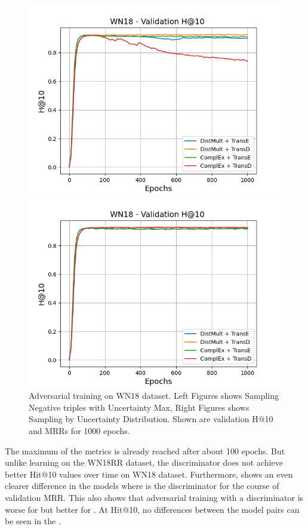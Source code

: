 \begin{figure}
\begin{minipage}{.5\textwidth}
    \end{minipage}
    \begin{minipage}{.5\textwidth}
      \centering
      \includegraphics[width=0.9\linewidth]{figures/results/gan_train/not_pretrained/uncertainty/max/entropy/wn18/1k_epochs/uncertainty_wn18_hit10.png}
    \end{minipage}%
    \begin{minipage}{.5\textwidth}
      \centering
      \includegraphics[width=0.9\linewidth]{figures/results/gan_train/not_pretrained/uncertainty/max_distribution/entropy/wn18/1k_epochs/uncertainty_wn18_hit10.png}
    \end{minipage}%
    \caption{Adversarial training on \textsc{WN18} dataset. 
    Left Figures shows Sampling Negative triples with Uncertainty Max, Right Figures shows Sampling by Uncertainty Distribution.
    Shown are validation H@10 and MRRs for 1000 epochs.}
    \label{fig:advtrain_wn18_usmax_ussoftmax}
\end{figure}
The maximum of the metrics is already reached after about 100 epochs.
But unlike learning on the \textsc{WN18RR} dataset, the discriminator does not achieve better Hit@10 values over time on \textsc{WN18} dataset.
Furthermore, \ussoftmax shows an even clearer difference in the models where \transd is the discriminator for the course of validation MRR.
This also shows that adversarial training with a \transd discriminator is worse for \usmax but better for \ussoftmax.
At Hit@10, no differences between the model pairs can be seen in the \ussoftmax.

